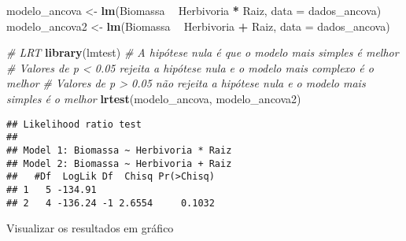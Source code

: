 \documentclass[
]{book}
\newenvironment{Shaded}{\begin{snugshade}}{\end{snugshade}}
\newcommand{\CommentTok}[1]{\textcolor[rgb]{0.56,0.35,0.01}{\textit{#1}}}
\newcommand{\DataTypeTok}[1]{\textcolor[rgb]{0.13,0.29,0.53}{#1}}
\newcommand{\KeywordTok}[1]{\textcolor[rgb]{0.13,0.29,0.53}{\textbf{#1}}}
\newcommand{\NormalTok}[1]{#1}
\newcommand{\OperatorTok}[1]{\textcolor[rgb]{0.81,0.36,0.00}{\textbf{#1}}}
\newcommand{\StringTok}[1]{\textcolor[rgb]{0.31,0.60,0.02}{#1}}
\begin{document}
\begin{Shaded}
\begin{Highlighting}[]
\NormalTok{modelo_ancova <-}\StringTok{ }\KeywordTok{lm}\NormalTok{(Biomassa }\OperatorTok{~}\StringTok{ }\NormalTok{Herbivoria }\OperatorTok{*}\StringTok{ }\NormalTok{Raiz, }\DataTypeTok{data =}\NormalTok{ dados_ancova)}
\NormalTok{modelo_ancova2 <-}\StringTok{ }\KeywordTok{lm}\NormalTok{(Biomassa }\OperatorTok{~}\StringTok{ }\NormalTok{Herbivoria }\OperatorTok{+}\StringTok{ }\NormalTok{Raiz, }\DataTypeTok{data =}\NormalTok{ dados_ancova)}

\CommentTok{# LRT }
\KeywordTok{library}\NormalTok{(lmtest)}
\CommentTok{# A hipótese nula é que o modelo mais simples é melhor}
\CommentTok{# Valores de p < 0.05 rejeita a hipótese nula e o modelo mais complexo é o melhor}
\CommentTok{# Valores de p > 0.05 não rejeita a hipótese nula e o modelo mais simples é o melhor}
\KeywordTok{lrtest}\NormalTok{(modelo_ancova, modelo_ancova2)}
\end{Highlighting}
\end{Shaded}

\begin{verbatim}
## Likelihood ratio test
## 
## Model 1: Biomassa ~ Herbivoria * Raiz
## Model 2: Biomassa ~ Herbivoria + Raiz
##   #Df  LogLik Df  Chisq Pr(>Chisq)
## 1   5 -134.91                     
## 2   4 -136.24 -1 2.6554     0.1032
\end{verbatim}

Visualizar os resultados em gráfico
\end{document}

